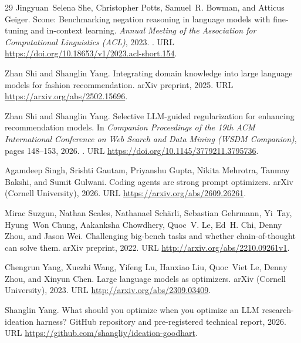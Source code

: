 \documentclass[10pt]{article}
\begin{document}
\begin{thebibliography}{29}
Jingyuan~Selena She, Christopher Potts, Samuel~R. Bowman, and Atticus Geiger.
\newblock Scone: Benchmarking negation reasoning in language models with
  fine-tuning and in-context learning.
\newblock \emph{Annual Meeting of the Association for Computational Linguistics
  (ACL)}, 2023.
\newblock {}.
\newblock URL \url{https://doi.org/10.18653/v1/2023.acl-short.154}.

Zhan Shi and Shanglin Yang.
\newblock Integrating domain knowledge into large language models for fashion
  recommendation.
\newblock arXiv preprint, 2025.
\newblock URL \url{https://arxiv.org/abs/2502.15696}.

Zhan Shi and Shanglin Yang.
\newblock Selective {LLM}-guided regularization for enhancing recommendation
  models.
\newblock In \emph{Companion Proceedings of the 19th ACM International
  Conference on Web Search and Data Mining (WSDM Companion)}, pages 148--153,
  2026.
\newblock {}.
\newblock URL \url{https://doi.org/10.1145/3779211.3795736}.

Agamdeep Singh, Srishti Gautam, Priyanshu Gupta, Nikita Mehrotra, Tanmay
  Bakshi, and Sumit Gulwani.
\newblock Coding agents are strong prompt optimizers.
\newblock arXiv (Cornell University), 2026.
\newblock URL \url{https://arxiv.org/abs/2609.26261}.

Mirac Suzgun, Nathan Scales, Nathanael Sch\"{a}rli, Sebastian Gehrmann, Yi~Tay,
  Hyung~Won Chung, Aakanksha Chowdhery, Quoc~V. Le, Ed~H. Chi, Denny Zhou, and
  Jason Wei.
\newblock Challenging big-bench tasks and whether chain-of-thought can solve
  them.
\newblock arXiv preprint, 2022.
\newblock URL \url{http://arxiv.org/abs/2210.09261v1}.

Chengrun Yang, Xuezhi Wang, Yifeng Lu, Hanxiao Liu, Quoc~Viet Le, Denny Zhou,
  and Xinyun Chen.
\newblock Large language models as optimizers.
\newblock arXiv (Cornell University), 2023.
\newblock URL \url{http://arxiv.org/abs/2309.03409}.

Shanglin Yang.
\newblock What should you optimize when you optimize an {LLM} research-ideation
  harness?
\newblock GitHub repository and pre-registered technical report, 2026.
\newblock URL \url{https://github.com/shangliy/ideation-goodhart}.


\end{thebibliography}
\end{document}
